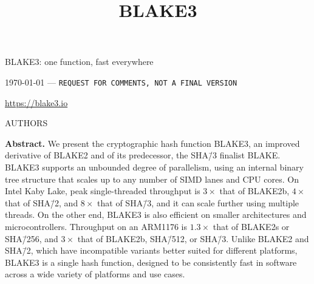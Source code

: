\documentclass[11pt,notitlepage,a4paper]{article}
\title{BLAKE3}
\begin{document}
\selectfont

\pagestyle{plain}

\begin{center}
{\huge BLAKE3: one function, fast everywhere}

\bigskip

\mydate\today 
\quad---\quad
{\large \tt REQUEST FOR COMMENTS, NOT A FINAL VERSION}

\medskip

\url{https://blake3.io}

\medskip

AUTHORS
\end{center}


\medskip

\begin{center}
  \begin{minipage}{0.92\linewidth}

      \textbf{Abstract.} We present the cryptographic hash function BLAKE3, an
      improved derivative of BLAKE2 and of its predecessor, the SHA\=/3 finalist
      BLAKE. BLAKE3 supports an unbounded degree of parallelism, using an internal
      binary tree structure that scales up to any number of SIMD lanes and CPU cores.
      On Intel Kaby Lake, peak single-threaded throughput is $3\times$ that of
      BLAKE2b, $4\times$ that of SHA\=/2, and $8\times$ that of SHA\=/3, and it can scale
      further using multiple threads. On the other end, BLAKE3 is also efficient on
      smaller architectures and microcontrollers. Throughput on an ARM1176
      is $1.3\times$ that of BLAKE2s or SHA\=/256, and $3\times$ that of BLAKE2b,
      SHA\=/512, or SHA\=/3. Unlike BLAKE2 and SHA\=/2, which have incompatible
      variants better suited for different platforms, BLAKE3 is a single hash
      function, designed to be consistently fast in software across a wide
      variety of platforms and use cases.

   \end{minipage}
\end{center}
\end{document}

